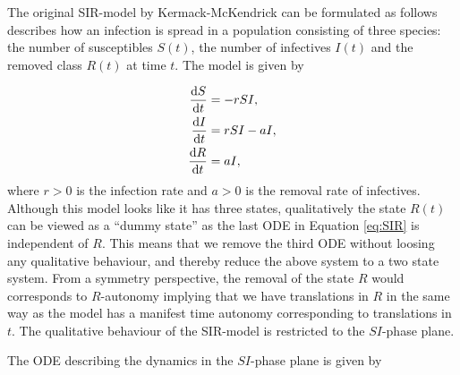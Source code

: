 The original SIR-model by Kermack-McKendrick \cite{SIR-model} can be formulated as follows describes how an infection is spread in a population consisting of three species: the number of susceptibles $S(t)$, the number of infectives $I(t)$ and the removed class $R(t)$ at time $t$. The model is given by

\begin{equation}
  \begin{split}
    \dv{S}{t}&=-rSI,\\
    \dv{I}{t}&=rSI-aI,\\
    \dv{R}{t}&=aI,\\
    \end{split}
  \label{eq:SIR}
\end{equation}
where $r>0$ is the infection rate and $a>0$ is the removal rate of infectives. Although this model looks like it has three states, qualitatively the state $R(t)$ can be viewed as a ``dummy state'' as the last ODE in Equation \eqref{eq:SIR} is independent of $R$. This means that we remove the third ODE without loosing any qualitative behaviour, and thereby reduce the above system to a two state system. From a symmetry perspective, the removal of the state $R$ would corresponds to $R$-autonomy implying that we have translations in $R$ in the same way as the model has a manifest time autonomy corresponding to translations in $t$. The qualitative behaviour of the SIR-model is restricted to the $SI$-phase plane.

The ODE describing the dynamics in the $SI$-phase plane is given by

